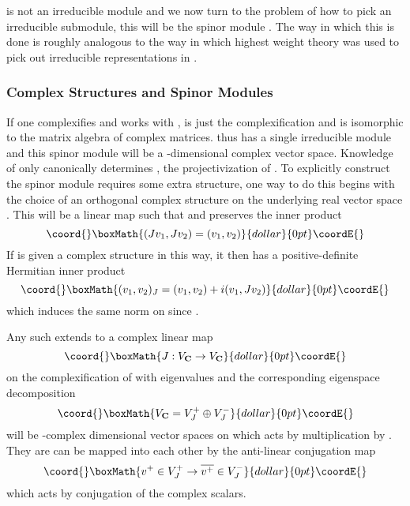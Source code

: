 \documentclass[a4paper,a4paper]{article}
\theoremstyle{conjecture}
\begin{document}
\coordHE{} is not an irreducible \coordHE{} module and we now turn to the problem
of how to pick an irreducible submodule, this will be the spinor module \coordHE{}.
The way in which this is done is roughly analogous to the way in which highest
weight theory was used to pick out irreducible representations in \coordHE{}.

\subsubsection{Complex Structures and Spinor Modules}

If one complexifies \coordHE{} and works with \coordHE{}, \coordHE{} is just the complexification
\coordHE{} and is isomorphic to the matrix algebra of
\coordHE{} complex matrices. \coordHE{} thus has a
single irreducible module and this spinor module \coordHE{} will be a
\coordHE{}-dimensional complex vector space. Knowledge of \coordHE{} only canonically determines \coordHE{}, the
projectivization of \coordHE{}. To explicitly construct the spinor module
\coordHE{} requires some extra structure, one way to do this begins with
the choice of an orthogonal complex structure \coordHE{} on the
underlying real vector space \coordHE{}.  This will be a linear map
\coordHE{} such that \coordHE{} and \coordHE{} preserves the inner
product
$$\coord{}\boxMath{(Jv_1,Jv_2)=(v_1,v_2)}{dollar}{0pt}\coordE{}$$
If \coordHE{} is given a complex structure in this way, it then has a positive-definite Hermitian inner
product
$$\coord{}\boxMath{(v_1,v_2)_J=(v_1,v_2) + i(v_1,Jv_2)}{dollar}{0pt}\coordE{}$$
which induces the same norm on \coordHE{} since \coordHE{}.

Any such \coordHE{} extends to a complex linear map $$\coord{}\boxMath{J:V_{\mathbf C}\rightarrow V_{\mathbf C}}{dollar}{0pt}\coordE{}$$
on the complexification of \coordHE{} with
eigenvalues \coordHE{} and the corresponding eigenspace decomposition
$$\coord{}\boxMath{V_{\mathbf C}=V^+_J\oplus V^-_J}{dollar}{0pt}\coordE{}$$  \coordHE{} will be \coordHE{}-complex dimensional vector spaces on which \coordHE{} acts by multiplication by \coordHE{}.
They are can be mapped into each other by the anti-linear conjugation map
$$\coord{}\boxMath{v^+\in V^+_J\rightarrow \overline {v^+}\in V^-_J}{dollar}{0pt}\coordE{}$$
which acts by conjugation of the complex scalars.
\end{document}
